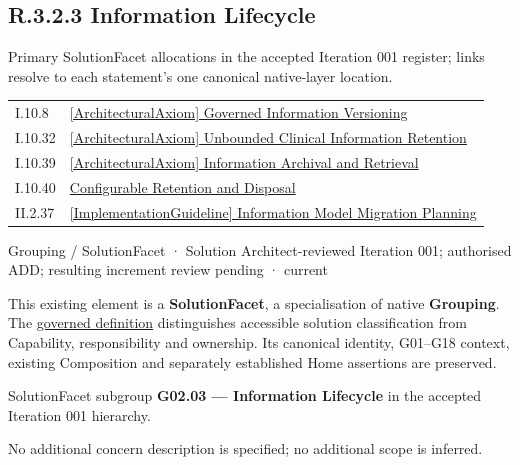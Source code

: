 \subsection*{R.3.2.3 Information Lifecycle}
\label{navigation:R.3.2.3}

Primary SolutionFacet allocations in the accepted Iteration 001 register; links resolve to each statement’s one canonical native-layer location.\par
\begin{longtable}{p{.22\linewidth}p{.73\linewidth}}
I.10.8 & \hyperref[element:2bd0132f072b42e9bf71bf483eb2deec]{[ArchitecturalAxiom] Governed Information Versioning} \\
I.10.32 & \hyperref[element:4c270732fecf4e79bb83c938861ce05b]{[ArchitecturalAxiom] Unbounded Clinical Information Retention} \\
I.10.39 & \hyperref[element:2429db4dbecc4a03a66f5189d76a6c38]{[ArchitecturalAxiom] Information Archival and Retrieval} \\
I.10.40 & \hyperref[element:b1a46fce85b4448fba55987af146d61e]{Configurable Retention and Disposal} \\
II.2.37 & \hyperref[element:4a2cd91fab0c42e98b09a017aefa66de]{[ImplementationGuideline] Information Model Migration Planning} \\
\end{longtable}
\label{element:b23f7fa8cb1b46569f63bde1aa5fbf1f}
{\small Grouping / SolutionFacet · Solution Architect-reviewed Iteration 001; authorised ADD; resulting increment review pending · current}\par

This existing element is a \textbf{SolutionFacet}, a specialisation of native
\textbf{Grouping}. The \href{\detokenize{../../../../../../../governance/continuum-representation.md#solutionfacet-classification--1119-candidate}}{governed definition}
distinguishes accessible solution classification from Capability, responsibility
and ownership. Its canonical identity, G01–G18 context, existing Composition
and separately established Home assertions are preserved.



SolutionFacet subgroup \textbf{G02.03 — Information Lifecycle} in the accepted Iteration 001 hierarchy.



No additional concern description is specified; no additional scope is inferred.



